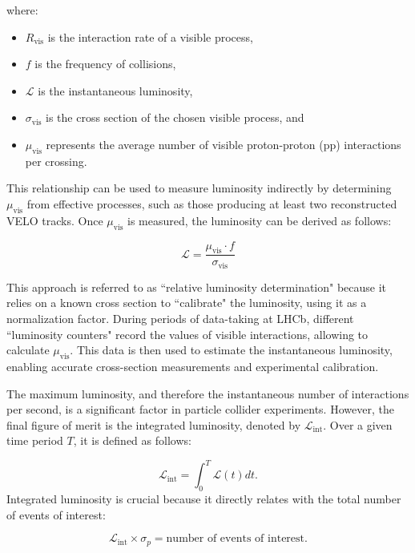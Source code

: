 where:
\begin{itemize}
\item  $R_{\text{vis}}$ is the interaction rate of a visible process,
\item  $f$ is the frequency of collisions,
\item  $\mathcal{L}$ is the instantaneous luminosity,
\item  $\sigma_{\text{vis}}$ is the cross section of the chosen visible process, and
\item  $\mu_{\text{vis}}$ represents the average number of visible proton-proton (pp) interactions per crossing.
\end{itemize}
This relationship can be used to measure luminosity indirectly by determining \(\mu_{\text{vis}}\) from effective processes, such as those producing at least two reconstructed VELO tracks. Once \(\mu_{\text{vis}}\) is measured, the luminosity can be derived as follows:

\begin{equation}
\mathcal{L} = \frac{\mu_{\text{vis}} \cdot f}{\sigma_{\text{vis}}}
\end{equation}

This approach is referred to as ``relative luminosity determination" because it relies on a known cross section to ``calibrate" the luminosity, using it as a normalization factor. During periods of data-taking at LHCb, different ``luminosity counters" record the values of visible interactions, allowing to calculate $\mu_{\text{vis}}$. This data is then used to estimate the instantaneous luminosity, enabling accurate cross-section measurements and experimental calibration.


The maximum luminosity, and therefore the instantaneous number of interactions per second, is a significant factor in particle collider experiments. However, the final figure of merit is the integrated luminosity, denoted by $\mathcal{L}_{\text{int}}$. Over a given time period \(T\), it is defined as follows:

\begin{equation}
\mathcal{L}_{\text{int}} = \int_0^T \mathcal{L}(t) dt .
\end{equation}
Integrated luminosity is crucial because it directly relates with the total number of events of interest:

\begin{equation}
\mathcal{L}_{\text{int}} \times \sigma_p = \text{number of events of interest}.
\end{equation}

